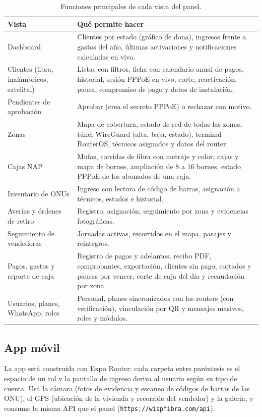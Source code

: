 \begin{table}[H]
\centering
\caption{Funciones principales de cada vista del panel.}
\label{tab:ce02-e3-vistas}
\small
\begin{tabularx}{\textwidth}{L{3.6cm}X}
\toprule
\textbf{Vista} & \textbf{Qué permite hacer} \\
\midrule
Dashboard & Clientes por estado (gráfico de dona), ingresos frente a gastos del año, últimas activaciones y notificaciones calculadas en vivo. \\
Clientes (fibra, inalámbricos, satelital) & Listas con filtros, ficha con calendario anual de pagos, historial, sesión PPPoE en vivo, corte, reactivación, pausa, compromiso de pago y datos de instalación. \\
Pendientes de aprobación & Aprobar (crea el secreto PPPoE) o rechazar con motivo. \\
Zonas & Mapa de cobertura, estado de red de todas las zonas, túnel WireGuard (alta, baja, estado), terminal RouterOS, técnicos asignados y datos del router. \\
Cajas NAP & Mufas, corridas de fibra con metraje y color, cajas y mapa de bornes, ampliación de 8 a 16 bornes, estado PPPoE de los abonados de una caja. \\
Inventario de ONUs & Ingreso con lectora de código de barras, asignación a técnicos, estados e historial. \\
Averías y órdenes de retiro & Registro, asignación, seguimiento por zona y evidencias fotográficas. \\
Seguimiento de vendedoras & Jornadas activas, recorridos en el mapa, pasajes y reintegros. \\
Pagos, gastos y reporte de caja & Registro de pagos y adelantos, recibo PDF, comprobantes, exportación, clientes sin pago, cortados y pausas por vencer, corte de caja del día y recaudación por zona. \\
Usuarios, planes, WhatsApp, roles & Personal, planes sincronizados con los routers (con verificación), vinculación por QR y mensajes masivos, roles y módulos. \\
\bottomrule
\end{tabularx}
\end{table}

\subsection{App móvil}

La app está construida con Expo Router: cada carpeta entre paréntesis es el espacio de un rol
y la pantalla de ingreso deriva al usuario según su tipo de cuenta. Usa la cámara (fotos de
evidencia y escaneo de códigos de barras de las ONU), el GPS (ubicación de la vivienda y
recorrido del vendedor) y la galería, y consume la misma API que el panel
(\texttt{https://wispfibra.com/api}).

